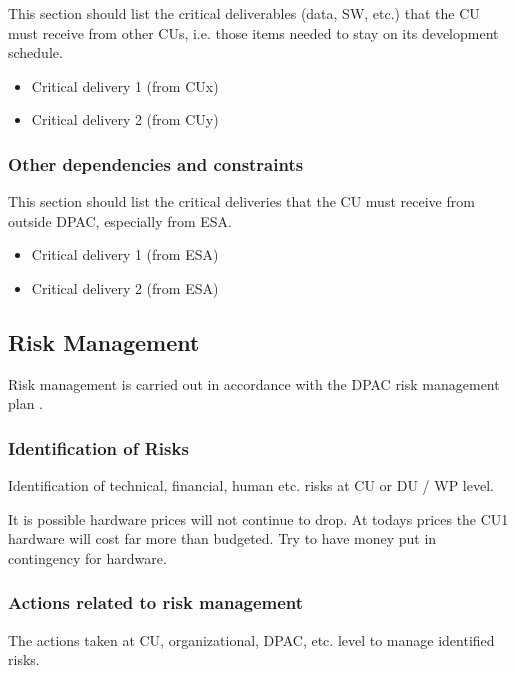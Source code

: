 \documentclass[CUx,lsstdraft,SDP]{lsstdoc}
\begin{document}
This section should list the critical deliverables (data, SW, etc.) that the CU must receive from other CUs, i.e. those items needed to stay on its development schedule.
\begin{itemize}
    \item Critical delivery 1 (from CUx)
    \item Critical delivery 2 (from CUy)
\end{itemize}

\subsubsection{Other dependencies and constraints  \label{sect:othercontraints}}

This section should list the critical deliveries that the CU must receive from outside DPAC, especially from ESA.
\begin{itemize}
    \item Critical delivery 1 (from ESA)
    \item Critical delivery 2 (from ESA)
\end{itemize}

\subsection{Risk Management \label{sect:riskmngt}}
Risk management is carried out in accordance with the DPAC risk management plan .

\subsubsection{Identification of Risks \label{sect:risks}}
Identification of technical, financial, human etc. risks at CU or DU / WP
level.

{It is possible hardware prices will not continue to drop. At todays prices the
CU1 hardware will cost far more than budgeted.}
{Try to have money put in contingency for hardware.}



\subsubsection{Actions related to risk management  \label{sect:riskactions}}
The actions taken at CU, organizational, DPAC, etc. level to manage identified risks.
\end{document}
